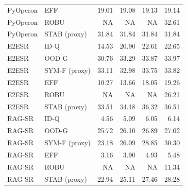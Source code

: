 \begin{tabular}{llrrrr}
PyOperon & EFF & 19.01 & 19.08 & 19.13 & 19.14 \\
PyOperon & ROBU & NA & NA & NA & 32.61 \\
PyOperon & STAB (proxy) & 31.84 & 31.84 & 31.84 & 31.84 \\
E2ESR & ID-Q & 14.53 & 20.90 & 22.61 & 22.65 \\
E2ESR & OOD-G & 30.76 & 33.29 & 33.87 & 33.97 \\
E2ESR & SYM-F (proxy) & 33.11 & 32.98 & 33.75 & 33.82 \\
E2ESR & EFF & 10.27 & 13.66 & 18.05 & 19.26 \\
E2ESR & ROBU & NA & NA & NA & 26.21 \\
E2ESR & STAB (proxy) & 33.51 & 34.18 & 36.32 & 36.51 \\
RAG-SR & ID-Q & 4.56 & 5.09 & 6.05 & 6.14 \\
RAG-SR & OOD-G & 25.72 & 26.10 & 26.89 & 27.02 \\
RAG-SR & SYM-F (proxy) & 23.18 & 26.09 & 28.85 & 30.30 \\
RAG-SR & EFF & 3.16 & 3.90 & 4.93 & 5.48 \\
RAG-SR & ROBU & NA & NA & NA & 11.34 \\
RAG-SR & STAB (proxy) & 22.94 & 25.11 & 27.46 & 28.28 \\
\bottomrule
\end{tabular}
